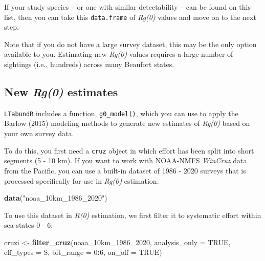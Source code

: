 \documentclass[
]{book}
\newenvironment{Shaded}{\begin{snugshade}}{\end{snugshade}}
\newcommand{\AttributeTok}[1]{\textcolor[rgb]{0.13,0.29,0.53}{#1}}
\newcommand{\ConstantTok}[1]{\textcolor[rgb]{0.56,0.35,0.01}{#1}}
\newcommand{\DecValTok}[1]{\textcolor[rgb]{0.00,0.00,0.81}{#1}}
\newcommand{\FunctionTok}[1]{\textcolor[rgb]{0.13,0.29,0.53}{\textbf{#1}}}
\newcommand{\NormalTok}[1]{#1}
\newcommand{\OtherTok}[1]{\textcolor[rgb]{0.56,0.35,0.01}{#1}}
\newcommand{\SpecialCharTok}[1]{\textcolor[rgb]{0.81,0.36,0.00}{\textbf{#1}}}
\newcommand{\StringTok}[1]{\textcolor[rgb]{0.31,0.60,0.02}{#1}}
\begin{document}
If your study species -- or one with similar detectability -- can be found on this list, then you can take this \texttt{data.frame} of \emph{Rg(0)} values and move on to the next step.

Note that if you do not have a large survey dataset, this may be the only option available to you. Estimating new \emph{Rg(0)} values requires a large number of sightings (i.e., hundreds) across many Beaufort states.

\hypertarget{new-rg0-estimates}{%
\subsection*{\texorpdfstring{New \emph{Rg(0)} estimates}{New Rg(0) estimates}}\label{new-rg0-estimates}}

\texttt{LTabundR} includes a function, \texttt{g0\_model()}, which you can use to apply the Barlow (2015) modeling methods to generate new estimates of \emph{Rg(0)} based on your own survey data.

To do this, you first need a \texttt{cruz} object in which effort has been split into short segments (5 - 10 km). If you want to work with NOAA-NMFS \emph{WinCruz} data from the Pacific, you can use a built-in dataset of 1986 - 2020 surveys that is processed specifically for use in \emph{Rg(0)} estimation:

\begin{Shaded}
\begin{Highlighting}[]
\FunctionTok{data}\NormalTok{(}\StringTok{"noaa\_10km\_1986\_2020"}\NormalTok{)}
\end{Highlighting}
\end{Shaded}

To use this dataset in \emph{R(0)} estimation, we first filter it to systematic effort within sea states 0 - 6:

\begin{Shaded}
\begin{Highlighting}[]
\NormalTok{cruzi }\OtherTok{\textless{}{-}} \FunctionTok{filter\_cruz}\NormalTok{(noaa\_10km\_1986\_2020,}
                     \AttributeTok{analysis\_only =} \ConstantTok{TRUE}\NormalTok{,}
                     \AttributeTok{eff\_types =} \StringTok{\textquotesingle{}S\textquotesingle{}}\NormalTok{,}
                     \AttributeTok{bft\_range =} \DecValTok{0}\SpecialCharTok{:}\DecValTok{6}\NormalTok{,}
                     \AttributeTok{on\_off =} \ConstantTok{TRUE}\NormalTok{)}
\end{Highlighting}
\end{Shaded}
\end{document}
